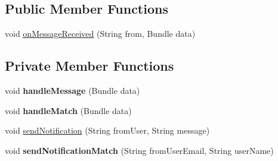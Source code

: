 \subsection*{Public Member Functions}
\begin{DoxyCompactItemize}
\item 
void \hyperlink{classcom_1_1example_1_1sebastian_1_1tindertp_1_1services_1_1MyGcmListenerService_ad65050d5130f62f8aa062f21fe49f35a}{on\+Message\+Received} (String from, Bundle data)
\end{DoxyCompactItemize}
\subsection*{Private Member Functions}
\begin{DoxyCompactItemize}
\item 
void {\bfseries handle\+Message} (Bundle data)\hypertarget{classcom_1_1example_1_1sebastian_1_1tindertp_1_1services_1_1MyGcmListenerService_ad5da91b9a4770cf5ed83bb6b896c84d1}{}\label{classcom_1_1example_1_1sebastian_1_1tindertp_1_1services_1_1MyGcmListenerService_ad5da91b9a4770cf5ed83bb6b896c84d1}

\item 
void {\bfseries handle\+Match} (Bundle data)\hypertarget{classcom_1_1example_1_1sebastian_1_1tindertp_1_1services_1_1MyGcmListenerService_a0bd04bde444fcf0d8c78c8b05a1f2395}{}\label{classcom_1_1example_1_1sebastian_1_1tindertp_1_1services_1_1MyGcmListenerService_a0bd04bde444fcf0d8c78c8b05a1f2395}

\item 
void \hyperlink{classcom_1_1example_1_1sebastian_1_1tindertp_1_1services_1_1MyGcmListenerService_ae7a722e3ab78f165da8183b952188fa0}{send\+Notification} (String from\+User, String message)
\item 
void {\bfseries send\+Notification\+Match} (String from\+User\+Email, String user\+Name)\hypertarget{classcom_1_1example_1_1sebastian_1_1tindertp_1_1services_1_1MyGcmListenerService_a8a77e09a4e898bc4321ec87656e6010d}{}\label{classcom_1_1example_1_1sebastian_1_1tindertp_1_1services_1_1MyGcmListenerService_a8a77e09a4e898bc4321ec87656e6010d}

\end{DoxyCompactItemize}
